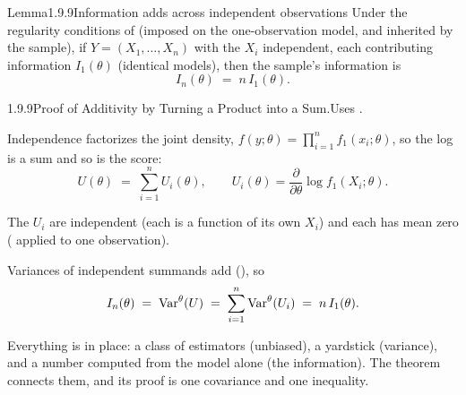\documentclass[main.tex]{subfiles}
\begin{document}
\begin{Obj}{Lemma}{1.9.9}{Information adds across independent observations}
Under the regularity conditions of  (imposed on the one-observation model, and
inherited by the sample), if $Y=(X_1,\dots,X_n)$ with the $X_i$ independent, each
contributing information $I_1(\theta)$ (identical models), then the sample's information is
\[ I_n(\theta) \;=\; n\, I_1(\theta) . \]
\end{Obj}
\begin{Prf}{1.9.9}{Proof of Additivity by Turning a Product into a Sum.}{Uses .}
\item Independence factorizes the joint density,
      $f(y;\theta)=\prod_{i=1}^n f_1(x_i;\theta)$, so the log is a sum and so is the score:
      \[ U(\theta) \;=\; \sum_{i=1}^n U_i(\theta), \qquad
         U_i(\theta)=\frac{\partial}{\partial\theta}\log f_1(X_i;\theta) . \]
\item The $U_i$ are independent (each is a function of its own $X_i$) and each has mean zero
      ( applied to one observation).
\item Variances of independent summands add (), so
      \[ I_n(\theta) \;=\; \operatorname{Var}^{\theta}(U) \;=\; \sum_{i=1}^n \operatorname{Var}^{\theta}(U_i)
         \;=\; n\, I_1(\theta) . \]
\end{Prf}

\medskip
Everything is in place: a class of estimators (unbiased), a yardstick (variance), and a
number computed from the model alone (the information). The theorem connects them, and its
proof is one covariance and one inequality.
\end{document}

